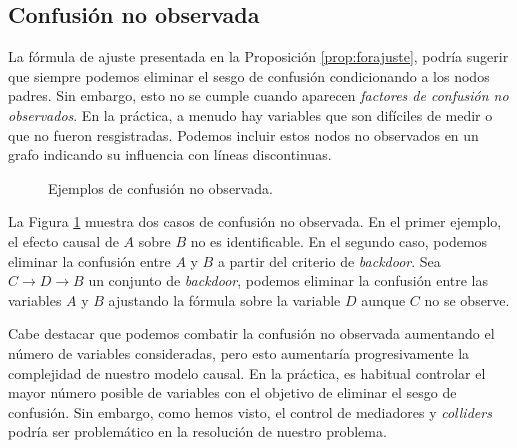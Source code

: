 \documentclass[oneside,openright,titlepage,numbers=noenddot,openany,headinclude,footinclude=true,
cleardoublepage=empty,abstractoff,BCOR=5mm,paper=a4,fontsize=12pt,main=spanish]{scrreprt}
\begin{document}
\subsection*{Confusión no observada}

La fórmula de ajuste presentada en la Proposición \ref{prop:forajuste}, podría sugerir que siempre podemos eliminar el sesgo de confusión condicionando a los nodos padres. Sin embargo, esto no se cumple cuando aparecen \textit{factores de confusión no observados}. En la práctica, a menudo hay variables que son difíciles de medir o que no fueron resgistradas. Podemos incluir estos nodos no observados en un grafo indicando su influencia con líneas discontinuas.\\

\begin{figure}[h]
\centering
{}
\caption{Ejemplos de confusión no observada.}
\label{fig:unobserved}
\end{figure}

La Figura \ref{fig:unobserved} muestra dos casos de confusión no observada. En el primer ejemplo, el efecto causal de $A$ sobre $B$ no es identificable. En el segundo caso, podemos eliminar la confusión entre $A$ y $B$ a partir del criterio de \textit{backdoor}. Sea $C \to D \to B$ un conjunto de \textit{backdoor}, podemos eliminar la confusión entre las variables $A$ y $B$ ajustando la fórmula sobre la variable $D$ aunque $C$ no se observe.

Cabe destacar que podemos combatir la confusión no observada aumentando el número de variables consideradas, pero esto aumentaría progresivamente la complejidad de nuestro modelo causal. En la práctica, es habitual controlar el mayor número posible de variables con el objetivo de eliminar el sesgo de confusión. Sin embargo, como hemos visto, el control de mediadores y \textit{colliders} podría ser problemático en la resolución de nuestro problema.
\end{document}
